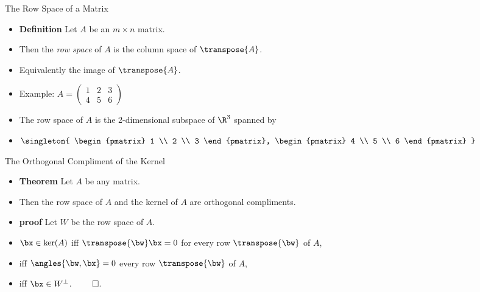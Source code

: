 \documentclass{beamer}
\begin{document}

\begin{frame}{The Row Space of a Matrix}
\begin{itemize}
\item \textbf{Definition} Let $A$ be an $m\times n$ matrix.
\item Then the \emph{row space} of $A$ is the column space of $\transpose{A}$.
\item Equivalently the image of $\transpose{A}$.
\item Example: $A=
\begin{pmatrix}
1 & 2 & 3 \\
4 & 5 & 6
\end{pmatrix}
$
\item The row space of $A$ is the 2-dimensional subspace of $\R^3$ spanned by
\item $
\singleton{
\begin{pmatrix}
1 \\ 2 \\ 3
\end{pmatrix},
\begin{pmatrix}
4 \\ 5 \\ 6
\end{pmatrix}
}
$
\end{itemize}
\end{frame}


\begin{frame}{The Orthogonal Compliment of the Kernel}
\begin{itemize}
\item \textbf{Theorem} Let $A$ be any matrix.
\item Then the row space of $A$ and the kernel of $A$ are orthogonal compliments.
\item \textbf{proof} Let $W$ be the row space of $A$.
\item $\bx\in\ker(A)$ iff $\transpose{\bw} \bx = 0$ for every row $\transpose{\bw}$ of $A$,
\item iff $\angles{\bw,\bx} = 0$ every row $\transpose{\bw}$ of $A$,
\item iff $\bx\in W^{\perp}$. $\qed$.
\end{itemize}
\end{frame}
\end{document}
